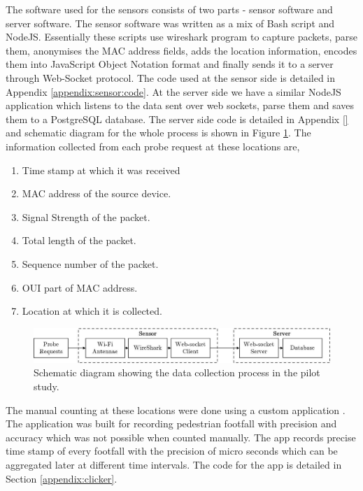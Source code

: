 The software used for the sensors consists of two parts - sensor software and server software.
The sensor software was written as a mix of Bash script and NodeJS.
Essentially these scripts use wireshark program to capture packets, parse them, anonymises the MAC address fields, adds the location information, encodes them into JavaScript Object Notation format and finally sends it to a server through Web-Socket protocol.
The code used at the sensor side is detailed in Appendix \ref{appendix:sensor:code}.
At the server side we have a similar NodeJS application which listens to the data sent over web sockets, parse them and saves them to a PostgreSQL database.
The server side code is detailed in Appendix \ref{} and schematic diagram for the whole process is shown in Figure \ref{figure:collection:pilot:schema}.
The information collected from each probe request at these locations are,

\begin{enumerate}[leftmargin=4em, rightmargin=2em]
  \itemsep-0.25em
  \item Time stamp at which it was received
  \item MAC address of the source device.
  \item Signal Strength of the packet.
  \item Total length of the packet.
  \item Sequence number of the packet.
  \item OUI part of MAC address.
  \item Location at which it is collected.
\end{enumerate}

\begin{figure}
  \includegraphics{images/pilot-study-system.jpeg}
  \caption{Schematic diagram showing the data collection process in the pilot study.}
  \label{figure:collection:pilot:schema}
\end{figure}

The manual counting at these locations were done using a custom application \citet{bala2018}. The application was built for recording pedestrian footfall with precision and accuracy which was not possible when counted manually. The app records precise time stamp of every footfall with the precision of micro seconds which can be aggregated later at different time intervals. The code for the app is detailed in Section \ref{appendix:clicker}.

